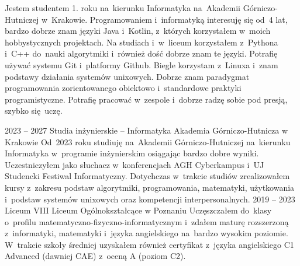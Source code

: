 \documentclass[8pt]{developercv} %
\begin{document}
\begin{minipage}[t]{0.5\textwidth} %
  \vspace{-\baselineskip} %
  Jestem studentem 1. roku na~kierunku Informatyka na~Akademii Górniczo-Hutniczej w~Krakowie.
  Programowaniem i~informatyką interesuję się od~4 lat, bardzo dobrze znam języki
  Java i~Kotlin, z~których korzystałem w~moich hobbystycznych projektach.
  Na studiach i~w~liceum korzystałem z~Pythona i~C++ do~nauki algorytmiki
  i~również dość dobrze znam te języki.
  Potrafię używać systemu Git i~platformy Github.
  Biegle korzystam z~Linuxa i~znam podstawy działania systemów unixowych.
  Dobrze znam paradygmat programowania zorientowanego obiektowo i~standardowe praktyki programistyczne.
  Potrafię pracować w~zespole i~dobrze radzę sobie pod presją, szybko się~uczę.

\end{minipage}
\hfill %
\begin{minipage}[t]{0.45\textwidth} %
	\vspace{-\baselineskip}
	\begin{barchart}{5.5}
	\end{barchart}
\end{minipage}





\begin{entrylist}
  \entry
    {2023 -- 2027}
    {Studia inżynierskie -- Informatyka}
    {Akademia Górniczo-Hutnicza w Krakowie}
    {
      Od~2023 roku studiuję na~Akademii Górniczo-Hutniczej na~kierunku Informatyka w~programie inżynierskim osiągając bardzo dobre wyniki.
      Uczestniczyłem jako słuchacz w~konferencjach AGH Cyberkampus i~UJ Studencki Festiwal Informatyczny.
      Dotychczas w~trakcie studiów zrealizowałem kursy z~zakresu podstaw algorytmiki, programowania, matematyki, użytkowania i~podstaw systemów unixowych oraz kompetencji interpersonalnych.
    }
  \entry
    {2019 -- 2023}
    {Liceum}
    {VIII Liceum Ogólnokształcące w Poznaniu}
    {
      Uczęszczałem do~klasy o~profilu matematyczno-fizyczno-informatycznym i~zdałem maturę rozszerzoną z~informatyki, matematyki i~języka angielskiego na~bardzo wysokim poziomie.
      W~trakcie szkoły średniej uzyskałem również certyfikat z~języka angielskiego C1 Advanced (dawniej CAE) z~oceną A (poziom C2).
    }
\end{entrylist}
\end{document}
